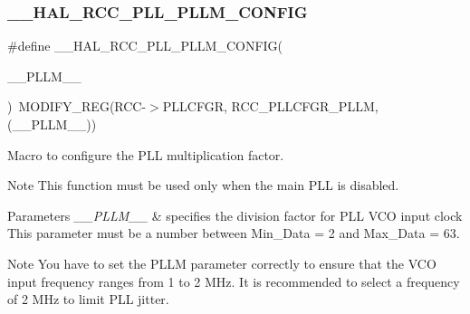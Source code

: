 \subsubsection{\texorpdfstring{\+\_\+\+\_\+\+H\+A\+L\+\_\+\+R\+C\+C\+\_\+\+P\+L\+L\+\_\+\+P\+L\+L\+M\+\_\+\+C\+O\+N\+F\+IG}{\_\_HAL\_RCC\_PLL\_PLLM\_CONFIG}}
{\footnotesize\ttfamily \#define \+\_\+\+\_\+\+H\+A\+L\+\_\+\+R\+C\+C\+\_\+\+P\+L\+L\+\_\+\+P\+L\+L\+M\+\_\+\+C\+O\+N\+F\+IG(\begin{DoxyParamCaption}\item[{}]{\+\_\+\+\_\+\+P\+L\+L\+M\+\_\+\+\_\+ }\end{DoxyParamCaption})~M\+O\+D\+I\+F\+Y\+\_\+\+R\+EG(R\+CC-\/$>$P\+L\+L\+C\+F\+GR, R\+C\+C\+\_\+\+P\+L\+L\+C\+F\+G\+R\+\_\+\+P\+L\+LM, (\+\_\+\+\_\+\+P\+L\+L\+M\+\_\+\+\_\+))}



Macro to configure the P\+LL multiplication factor. 

\begin{DoxyNote}{Note}
This function must be used only when the main P\+LL is disabled. 
\end{DoxyNote}

\begin{DoxyParams}{Parameters}
{\em \+\_\+\+\_\+\+P\+L\+L\+M\+\_\+\+\_\+} & specifies the division factor for P\+LL V\+CO input clock This parameter must be a number between Min\+\_\+\+Data = 2 and Max\+\_\+\+Data = 63. \\
\hline
\end{DoxyParams}
\begin{DoxyNote}{Note}
You have to set the P\+L\+LM parameter correctly to ensure that the V\+CO input frequency ranges from 1 to 2 M\+Hz. It is recommended to select a frequency of 2 M\+Hz to limit P\+LL jitter. 
\end{DoxyNote}
\mbox{\label{group___r_c_c___p_l_l___configuration_gaf9a8466f991888332ec978dc92c62d7d}} 
